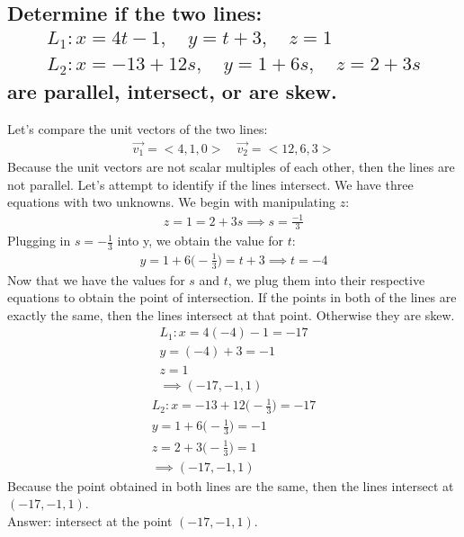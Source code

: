 \documentclass{article}
\begin{document}
\subsection{Determine if the two lines:
	\begin{align*}
		L_1: x = 4t - 1, \quad y = t + 3, \quad z = 1 \\
		L_2: x = -13 + 12s, \quad y = 1 + 6s, \quad z = 2 + 3s
	\end{align*}
	are parallel, intersect, or are skew.
}
Let's compare the unit vectors of the two lines:
\begin{align*}
	\vec{v_1} = <4, 1, 0> \quad \vec{v_2} = <12, 6, 3>
\end{align*}
Because the unit vectors are not scalar multiples of each other, then the lines are not parallel. Let's attempt to identify if the lines intersect. We have three equations with two unknowns. We begin with manipulating $z$:
\begin{align*}
	z = 1 = 2 + 3s \implies s = \frac{-1}{3}
\end{align*}
Plugging in $s = -\frac{1}{3}$ into y, we obtain the value for $t$:
\begin{align*}
	y = 1 + 6\bigg( -\frac{1}{3} \bigg) = t + 3 \implies t = -4
\end{align*}
Now that we have the values for $s$ and $t$, we plug them into their respective equations to obtain the point of intersection. If the points in both of the lines are exactly the same, then the lines intersect at that point. Otherwise they are skew.
\begin{align*}
	L_1: x = 4(-4) - 1 = -17 \\
		y = (-4) + 3 = -1 \\
		z = 1 \\
		\implies (-17, -1, 1)
\end{align*}
\begin{align*}
	L_2: x = -13 + 12\bigg(-\frac{1}{3}\bigg) = -17 \\
		y = 1 + 6\bigg(-\frac{1}{3}\bigg) = -1 \\
		z = 2 + 3\bigg(-\frac{1}{3}\bigg) = 1\\
		\implies (-17,-1,1)
\end{align*}
Because the point obtained in both lines are the same, then the lines intersect at $(-17, -1, 1)$. \\[10pt]
Answer: intersect at the point $(-17, -1, 1)$.

\end{document}
